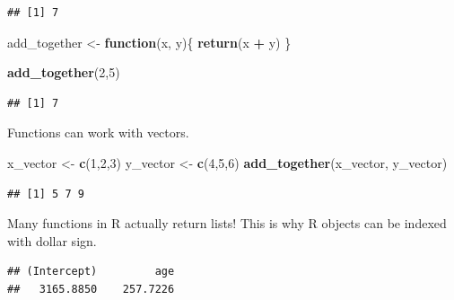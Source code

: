 \documentclass[]{book}
\newenvironment{Shaded}{\begin{snugshade}}{\end{snugshade}}
\newcommand{\ControlFlowTok}[1]{\textcolor[rgb]{0.13,0.29,0.53}{\textbf{#1}}}
\newcommand{\DataTypeTok}[1]{\textcolor[rgb]{0.13,0.29,0.53}{#1}}
\newcommand{\DecValTok}[1]{\textcolor[rgb]{0.00,0.00,0.81}{#1}}
\newcommand{\KeywordTok}[1]{\textcolor[rgb]{0.13,0.29,0.53}{\textbf{#1}}}
\newcommand{\NormalTok}[1]{#1}
\newcommand{\OperatorTok}[1]{\textcolor[rgb]{0.81,0.36,0.00}{\textbf{#1}}}
\newcommand{\StringTok}[1]{\textcolor[rgb]{0.31,0.60,0.02}{#1}}
\begin{document}
\begin{verbatim}
## [1] 7
\end{verbatim}

\begin{Shaded}
\begin{Highlighting}[]
\NormalTok{add_together <-}\StringTok{ }\ControlFlowTok{function}\NormalTok{(x, y)\{}
  \KeywordTok{return}\NormalTok{(x }\OperatorTok{+}\StringTok{ }\NormalTok{y)}
\NormalTok{\}}

\KeywordTok{add_together}\NormalTok{(}\DecValTok{2}\NormalTok{,}\DecValTok{5}\NormalTok{)}
\end{Highlighting}
\end{Shaded}

\begin{verbatim}
## [1] 7
\end{verbatim}

Functions can work with vectors.

\begin{Shaded}
\begin{Highlighting}[]
\NormalTok{x_vector <-}\StringTok{ }\KeywordTok{c}\NormalTok{(}\DecValTok{1}\NormalTok{,}\DecValTok{2}\NormalTok{,}\DecValTok{3}\NormalTok{)}
\NormalTok{y_vector <-}\StringTok{ }\KeywordTok{c}\NormalTok{(}\DecValTok{4}\NormalTok{,}\DecValTok{5}\NormalTok{,}\DecValTok{6}\NormalTok{)}
\KeywordTok{add_together}\NormalTok{(x_vector, y_vector)}
\end{Highlighting}
\end{Shaded}

\begin{verbatim}
## [1] 5 7 9
\end{verbatim}

Many functions in R actually return lists! This is why R objects can be indexed with dollar sign.

\begin{Shaded}
\end{Shaded}

\begin{verbatim}
## (Intercept)         age 
##   3165.8850    257.7226
\end{verbatim}
\end{document}
